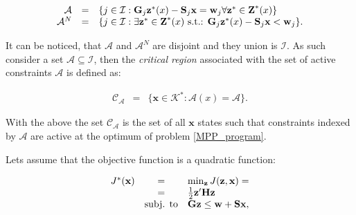     \begin{equation}
    \begin{array}{rcl}
            \mathcal{A}&=&\{j\in\mathcal{I}:\textbf{G}_j\textbf{z}^*(x)-\textbf{S}_j\textbf{x}=\textbf{w}_j\forall\textbf{z}^*\in\textbf{Z}^*(x)\}\\
            \mathcal{A}^N&=&\{j\in\mathcal{I}:\exists\textbf{z}^*\in\textbf{Z}^*(x)\textnormal{ s.t.: }\textbf{G}_j\textbf{z}^*(x)-\textbf{S}_j\textbf{x}<\textbf{w}_j\}.
        \end{array}
        \label{BASICMPC:equ:MPP_stateset_optimal partition}
    \end{equation}

    It can be noticed, that $\mathcal{A}$ and $\mathcal{A}^N$ are disjoint and they union is $\mathcal{I}$. As such consider a set $\mathcal{A}\subseteq\mathcal{I}$, then the \emph{critical region} associated with the set of active constraints $\mathcal{A}$ is defined as:

    \begin{equation}
    \begin{array}{rcl}
            \mathcal{C}_{\mathcal{A}}&=&\{\textbf{x}\in\mathcal{K}^*:\mathcal{A}(x)=\mathcal{A}\}.
        \end{array}
        \label{BASICMPC:equ:MPP_stateset_optimal critical}
    \end{equation}

    With the above the set $\mathcal{C}_{\mathcal{A}}$ is the set of all $\textbf{x}$ states such that constraints indexed by $\mathcal{A}$ are active at the optimum of problem \ref{MPP_program}.

    \label{BASICCSR:sec:MPP_QP}
    
    Lets assume that the objective function is a quadratic function:
    
    \begin{equation}
    \begin{array}{rcl}
            J^*(\textbf{x})&=&\min_{\textbf{z}}J(\textbf{z},\textbf{x})=\\
            &=&\frac{1}{2}\textbf{z}'\textbf{H}\textbf{z}\\
            &\textnormal{subj. to}&\textbf{Gz}\leq\textbf{w}+\textbf{Sx},
        \end{array}
        \label{BASICMPC:equ:MPP_quadratic}
    \end{equation}
    
